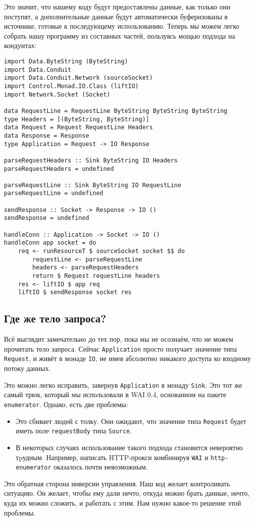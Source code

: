 Это значит, что нашему коду будут предоставлены данные, как только они поступят,
а дополнительные данные будут автоматически буферизованы в источнике,
готовые к последующему использованию. Теперь мы можем легко собрать нашу программу
из составных частей, пользуясь мощью подхода на кондуитах:
\begin{lstlisting}
import Data.ByteString (ByteString)
import Data.Conduit
import Data.Conduit.Network (sourceSocket)
import Control.Monad.IO.Class (liftIO)
import Network.Socket (Socket)

data RequestLine = RequestLine ByteString ByteString ByteString
type Headers = [(ByteString, ByteString)]
data Request = Request RequestLine Headers
data Response = Response
type Application = Request -> IO Response

parseRequestHeaders :: Sink ByteString IO Headers
parseRequestHeaders = undefined

parseRequestLine :: Sink ByteString IO RequestLine
parseRequestLine = undefined

sendResponse :: Socket -> Response -> IO ()
sendResponse = undefined

handleConn :: Application -> Socket -> IO ()
handleConn app socket = do
    req <- runResourceT $ sourceSocket socket $$ do
        requestLine <- parseRequestLine
        headers <- parseRequestHeaders
        return $ Request requestLine headers
    res <- liftIO $ app req
    liftIO $ sendResponse socket res
\end{lstlisting}

\subsection{Где же тело запроса?}
Всё выглядит замечательно до тех пор, пока мы не осознаём, что не можем прочитать тело запроса.
Сейчас
\lstinline{Application} просто получает значение типа \lstinline'Request', и живёт
в монаде \lstinline'IO', не имея абсолютно никакого
доступа ко входному потоку данных.

Это можно легко исправить, завернув \lstinline'Application' в монаду \lstinline{Sink}.
Это тот же самый трюк, который мы использовали в WAI 0.4, основанном на пакете \texttt{enumerator}.
Однако, есть две проблемы:

\begin{itemize}
\item Это сбивает людей с толку. Они ожидают, что значение типа
\lstinline'Request' будет иметь поле \lstinline'requestBody' типа
\lstinline'Source'.
\item В некоторых случаях использование такого подхода становится невероятно
тpудным. Например, написать HTTP-прокси комбинируя \texttt{WAI} и \texttt{http-enumerator}
оказалось почти невозможным.
\end{itemize}
Это обратная сторона инверсии управления. Наш код желает контроливать ситуацию.
Он желает, чтобы ему дали нечто, откуда можно брать данные, нечто,
куда их можно сложить, и работать с этим. Нам нужно какое-то решение этой проблемы.

